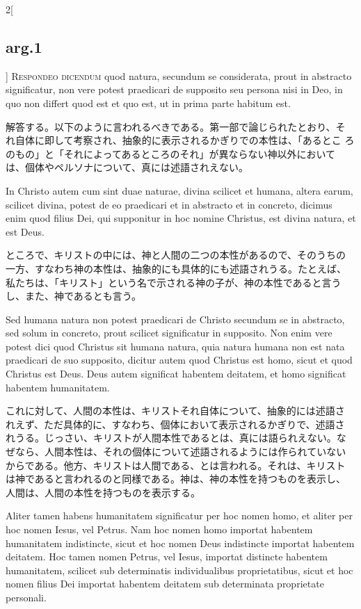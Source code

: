 \documentclass[paper=a4paper,fontsize=10pt,jafontsize=9pt,titlepage]{jlreq}
\begin{document}
\begin{paracol}{2}[\subsection{arg.1}]
{\scshape Respondeo dicendum} quod natura, secundum se
 considerata, prout in abstracto significatur, non vere potest
 praedicari de supposito seu persona nisi in Deo, in quo non differt
 quod est et quo est, ut in prima parte habitum est.

\switchcolumn

解答する。以下のように言われるべきである。第一部で論じられたとおり、そ
れ自体に即して考察され、抽象的に表示されるかぎりでの本性は、「あるとこ
ろのもの」と「それによってあるところのそれ」が異ならない神以外において
は、個体やペルソナについて、真には述語されえない。

\switchcolumn*

In Christo autem
 cum sint duae naturae, divina scilicet et humana, altera earum,
 scilicet divina, potest de eo praedicari et in abstracto et in
 concreto, dicimus enim quod filius Dei, qui supponitur in hoc nomine
 Christus, est divina natura, et est Deus.

\switchcolumn

ところで、キリストの中には、神と人間の二つの本性があるので、そのうちの
一方、すなわち神の本性は、抽象的にも具体的にも述語されうる。たとえば、
私たちは、「キリスト」という名で示される神の子が、神の本性であると言う
し、また、神であるとも言う。

\switchcolumn*

Sed humana natura non potest
 praedicari de Christo secundum se in abstracto, sed solum in concreto,
 prout scilicet significatur in supposito. Non enim vere potest dici
 quod Christus sit humana natura, quia natura humana non est nata
 praedicari de suo supposito, dicitur autem quod Christus est homo,
 sicut et quod Christus est Deus. Deus autem significat habentem
 deitatem, et homo significat habentem humanitatem.

\switchcolumn

これに対して、人間の本性は、キリストそれ自体について、抽象的には述語さ
れえず、ただ具体的に、すなわち、個体において表示されるかぎりで、述語さ
れうる。じっさい、キリストが人間本性であるとは、真には語られえない。な
ぜなら、人間本性は、それの個体について述語されるようには作られていない
からである。他方、キリストは人間である、とは言われる。それは、キリスト
は神であると言われるのと同様である。神は、神の本性を持つものを表示し、
人間は、人間の本性を持つものを表示する。

\switchcolumn*

Aliter tamen habens
 humanitatem significatur per hoc nomen homo, et aliter per hoc nomen
 Iesus, vel Petrus. Nam hoc nomen homo importat habentem humanitatem
 indistincte, sicut et hoc nomen Deus indistincte importat habentem
 deitatem. Hoc tamen nomen Petrus, vel Iesus, importat distincte
 habentem humanitatem, scilicet sub determinatis individualibus
 proprietatibus, sicut et hoc nomen filius Dei importat habentem
 deitatem sub determinata proprietate personali.


\end{paracol}
\end{document}
